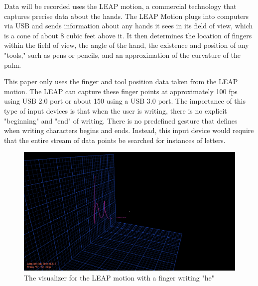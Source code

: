 Data will be recorded uses the LEAP motion, a commercial technology that captures precise data about the hands.
The LEAP Motion plugs into computers via USB and sends information about any hands it sees in its field of view, which is a cone of about 8 cubic feet above it.
It then determines the location of fingers within the field of view, the angle of the hand, the existence and position of any "tools," such as pens or pencils, and an approximation of the curvature of the palm.

This paper only uses the finger  and tool position data taken from the LEAP motion. The LEAP can capture these finger points at approximately 100 fps using USB 2.0 port or about 150 using a USB 3.0 port.
The importance of this type of input devices is that when the user is writing, there is no explicit "beginning" and "end" of writing. There is no predefined gesture that defines when writing characters begins and ends. Instead, this input device would require that the entire stream of data points be searched for instances of letters. 
\begin{figure}
  \begin{center}
  \includegraphics[width=\columnwidth]{images/he-3d-2.PNG}
  \caption{The visualizer for the LEAP motion with a finger writing "he"}
  \label{fig:teaser}
  \end{center}  
\end{figure}

